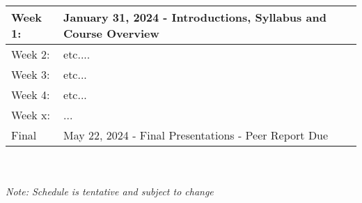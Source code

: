 \renewcommand{\arraystretch}{1.5}
\begin{tabular}{ | l | l |  }
    \hline
    Week 1: & January 31, 2024 - Introductions, Syllabus and Course Overview \\
    \hline
    Week 2: & etc.... \\
    \hline
    Week 3: & etc... \\
    \hline
    Week 4: & etc... \\
    \hline
    Week x: & ... \\
    \hline
    Final & May 22, 2024 - Final Presentations - Peer Report Due \\
    \hline
\end{tabular}
\\ \\
\textit{Note: Schedule is tentative and subject to change}

    